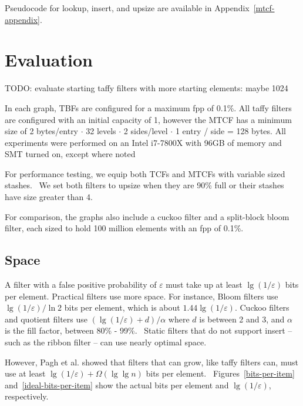 \documentclass[sigconf, nonacm]{acmart}
\begin{document}
Pseudocode for lookup, insert, and upsize are available in Appendix~\ref{mtcf-appendix}.


\section{Evaluation}
\label{eval}

TODO: evaluate starting taffy filters with more starting elements: maybe 1024

In each graph, TBFs are configured for a maximum fpp of 0.1\%.
All taffy filters are configured with an initial capacity of 1, however the MTCF has a minimum size of 2 bytes/entry $\cdot$ 32 levels $\cdot$ 2 sides/level $\cdot$ 1 entry / side = 128 bytes.
All experiments were performed on an Intel i7-7800X with 96GB of memory and SMT turned on, except where noted

For performance testing, we equip both TCFs and MTCFs with variable sized stashes.~\cite{stash}
We set both filters to upsize when they are 90\% full or their stashes have size greater than 4.

For comparison, the graphs also include a cuckoo filter and a split-block bloom filter, each sized to hold 100 million elements with an fpp of 0.1\%.

\subsection{Space}

A filter with a false positive probability of $\varepsilon$ must take up at least $\lg (1/\varepsilon)$ bits per element.
Practical filters use more space.
For instance, Bloom filters use $\lg (1/\varepsilon)/\ln 2$ bits per element, which is about $1.44 \lg (1/\varepsilon)$.
Cuckoo filters and quotient filters use $(\lg (1/\varepsilon) + d) / \alpha$ where $d$ is between 2 and 3, and $\alpha$ is the fill factor, between 80\% - 99\%.~\cite{cuckoo,quotient-filter,vector-quotient}
Static filters that do not support insert -- such as the ribbon filter -- can use nearly optimal space.~\cite{ribbon}

However, Pagh et al. showed that filters that can grow, like taffy filters can, must use at least $\lg (1/\varepsilon) + \Omega(\lg \lg n)$ bits per element.~\cite{psw}
Figures~\ref{bits-per-item} and~\ref{ideal-bits-per-item} show the actual bits per element and $\lg (1/\varepsilon)$, respectively.
\end{document}
